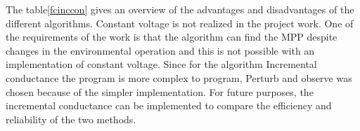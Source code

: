 The table\ref{fcinccon} gives an overview of the advantages and disadvantages of the different algorithms.
%		
Constant voltage is not realized in the project work. One of the requirements of the work is that the algorithm can find the MPP despite changes in the environmental operation and this is not possible with an implementation of constant voltage. Since for the algorithm Incremental conductance the program is more complex to program, Perturb and observe was chosen because of the simpler implementation. For future purposes, the incremental conductance can be implemented to compare the efficiency and reliability of the two methods.


